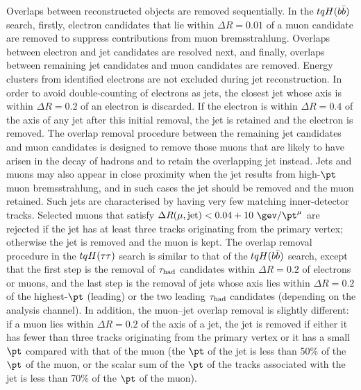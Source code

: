 Overlaps between reconstructed objects are removed sequentially. In the $tqH(b\bar{b})$ search, firstly, electron candidates that lie 
within $\Delta R = 0.01$ of a muon candidate are removed to suppress contributions from muon bremsstrahlung. 
Overlaps between electron and jet candidates are resolved next, and finally, overlaps between remaining jet candidates 
and muon candidates are removed. Energy clusters from identified electrons are not excluded during jet reconstruction. 
In order to avoid double-counting of electrons as jets, the closest jet whose axis is within ${\Delta}R = 0.2$ of an electron 
is discarded. If the electron is within ${\Delta}R = 0.4$ of the axis of any jet after this initial removal, the jet is retained and  the electron is removed.
The overlap removal procedure between the remaining jet candidates and muon candidates is designed to remove those muons 
that are likely to have arisen in the decay of hadrons and to retain the overlapping jet instead. 
Jets and muons may also appear in close proximity when the jet results from high-$\pt$ muon bremsstrahlung, 
and in such cases the jet should be removed and the muon retained. Such jets are characterised by having very 
few matching inner-detector tracks. Selected muons that satisfy $\Delta R(\mu,{\textrm{jet}}) < 0.04+10~\gev/\pt^\mu$ are rejected
if the jet has at least three tracks originating from the primary vertex; otherwise the jet is removed and the muon is kept.
The overlap removal procedure in the $tqH(\tau\tau)$ search is similar to that of the $tqH(b\bar{b})$ search, except that the
first step is the removal of $\tau_{\mathrm{had}}$ candidates within $\Delta R=0.2$ of electrons or muons, and the last step is the
removal of jets whose axis lies within $\Delta R=0.2$ of the highest-$\pt$ (leading) or the two leading $\tau_{\mathrm{had}}$ candidates (depending on the
analysis channel). In addition, the muon--jet overlap removal is slightly different:
if a muon lies within $\Delta R = 0.2$ of the axis of a jet, the jet is removed if either it has fewer than three tracks originating from the 
primary vertex or it has a small $\pt$ compared with that of the muon (the $\pt$ of the jet is less than 50\% of the $\pt$ of the muon,
or the scalar sum of the $\pt$ of the tracks associated with the jet is less than 70\% of the $\pt$ of the muon).

